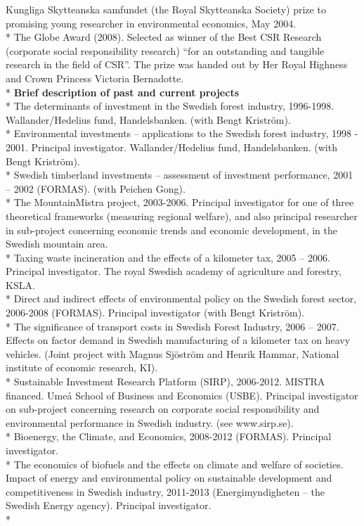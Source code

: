 \documentclass[11pt,a4paper]{extarticle}
\begin{document}
Kungliga Skytteanska samfundet (the Royal Skytteanska Society) prize to promising young researcher in environmental economics, May 2004.\\*
The Globe Award (2008). Selected as winner of the Best CSR Research (corporate social responsibility research) “for an outstanding and tangible research in the field of CSR”. The prize was handed out by Her Royal Highness and Crown Princess Victoria Bernadotte.\\*
\textbf{Brief description of past and current projects}\\*
The determinants of investment in the Swedish forest industry, 1996-1998. Wallander/Hedelius fund, Handelsbanken. (with Bengt Kriström).\\*
Environmental investments – applications to the Swedish forest industry, 1998 - 2001. Principal investigator. Wallander/Hedelius fund, Handelsbanken. (with Bengt Kriström).\\*
Swedish timberland investments – assessment of investment performance, 2001 – 2002 (FORMAS). (with Peichen Gong).\\*
The MountainMistra project, 2003-2006. Principal investigator for one of three theoretical frameworks (measuring regional welfare), and also principal researcher in sub-project concerning economic trends and economic development, in the Swedish mountain area.\\*
Taxing waste incineration and the effects of a kilometer tax, 2005 – 2006. Principal investigator. The royal Swedish academy of agriculture and forestry, KSLA.\\*
Direct and indirect effects of environmental policy on the Swedish forest sector, 2006-2008 (FORMAS). Principal investigator (with Bengt Kriström).\\*
The significance of transport costs in Swedish Forest Industry, 2006 – 2007. Effects on factor demand in Swedish manufacturing of a kilometer tax on heavy vehicles. (Joint project with Magnus Sjöström and Henrik Hammar, National institute of economic research, KI).\\*
Sustainable Investment Research Platform (SIRP), 2006-2012. MISTRA financed. Umeå School of Business and Economics (USBE). Principal investigator on sub-project concerning research on corporate social responsibility and environmental performance in Swedish industry. (see www.sirp.se).\\*
Bioenergy, the Climate, and Economics, 2008-2012 (FORMAS). Principal investigator.\\*
The economics of biofuels and the effects on climate and welfare of societies. Impact of energy and environmental policy on sustainable development and competitiveness in Swedish industry, 2011-2013 (Energimyndigheten – the Swedish Energy agency). Principal investigator.\\*
\end{document}
